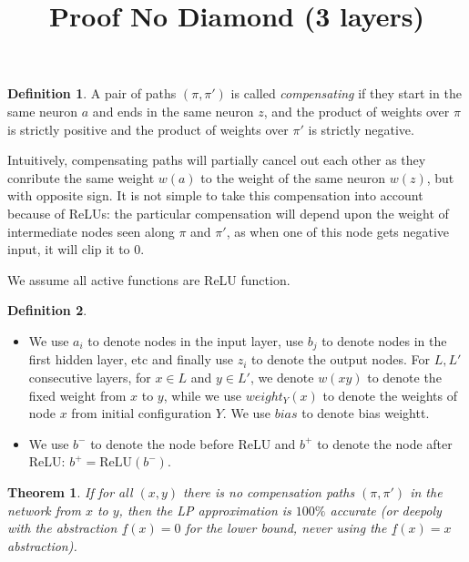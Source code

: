 \documentclass[]{article}
\title{Proof No Diamond (3 layers)}
\date{}
\newtheorem{theorem}{Theorem}
\theoremstyle{definition}
\newtheorem{definition}{Definition}
\newcommand{\ReLU}{\mathrm{ReLU}}
\begin{document}
\maketitle

\begin{definition}
	A pair of paths $(\pi,\pi')$
	is called {\em compensating} if they start in the same neuron $a$ and 
	ends in the same neuron $z$, and the product of weights over $\pi$ is strictly positive and the product of weights over $\pi'$ is strictly negative.
\end{definition}

Intuitively, compensating paths will partially cancel out each other as they conribute the same weight $w(a)$ to the weight of the same neuron $w(z)$, but with opposite sign. 
It is not simple to take this compensation into account because of ReLUs: the particular compensation will depend upon the weight of intermediate nodes seen along $\pi$ and $\pi'$, 
as when one of this node gets negative input, it will clip it to 0.


We assume all active functions are ReLU function.

\begin{definition}

	\begin{itemize}
	 \item  We use $a_i$ to denote nodes in the input layer, use $b_j$ to denote nodes in the first hidden layer, etc and finally use $z_i$ to denote the output nodes.
	For $L,L'$ consecutive layers, for $x \in L$ and $y \in L'$, we denote 
	$w({x y})$ to denote the fixed weight from $x$ to $y$, while we use
	$weight_Y(x)$ to denote the weights of node $x$ from initial configuration $Y$. 
	We use $bias$ to denote bias weightt.
	
	\item We use $b^-$ to denote the node before ReLU and $b^+$ to denote the node after ReLU: $b^+ = \ReLU(b^-)$.
	\end{itemize}
	
\end{definition}





\begin{theorem}
	\label{th1}
	If for all $(x,y)$ there is no compensation paths $(\pi,\pi')$ 
	in the network from $x$ to $y$, then the LP approximation is 
	$100\%$ accurate (or deepoly with the abstraction $\underline{f}(x) = 0$ for the lower bound, never using the $\underline{f}(x) = x$ abstraction). 
\end{theorem}
\end{document}
